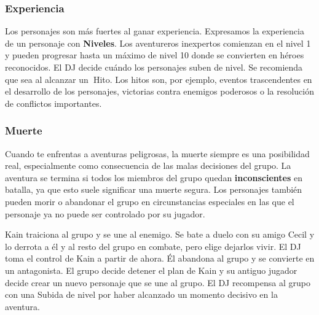 \vfill

\subsubsection*{Experiencia}
Los personajes son más fuertes al ganar experiencia. Expresamos la experiencia de un personaje con \textbf{Niveles}. Los aventureros inexpertos comienzan en el nivel 1 y pueden progresar hasta un máximo de nivel 10 donde se convierten en héroes reconocidos. El DJ decide cuándo los personajes suben de nivel. Se recomienda que sea al alcanzar un\mbox{\textbf{\hypertarget{ms}{ }}}Hito. Los hitos son, por ejemplo, eventos trascendentes en el desarrollo de los personajes, victorias contra enemigos poderosos o la resolución de conflictos importantes. 

\vfill

\subsubsection*{Muerte}
Cuando te enfrentas a aventuras peligrosas, la muerte siempre es una posibilidad real, especialmente como consecuencia de las malas decisiones del grupo. La aventura se termina si todos los miembros del grupo quedan \textbf{inconscientes }en batalla, ya que esto suele significar una muerte segura. Los personajes también pueden morir o abandonar el grupo en circunstancias especiales en las que el personaje ya no puede ser controlado por su jugador. 

\vspace{1cm}

{
 Kain traiciona al grupo y se une al enemigo. Se bate a duelo con su amigo Cecil y lo derrota a él y al resto del grupo en combate, pero elige dejarlos vivir. El DJ toma el control de Kain a partir de ahora. Él abandona al grupo y se convierte en un antagonista. El grupo decide detener el plan de Kain y su antiguo jugador decide crear un nuevo personaje que se une al grupo. El DJ recompensa al grupo con una Subida de nivel por haber alcanzado un momento decisivo en la aventura.
}

\pagebreak
